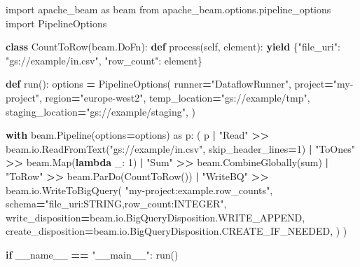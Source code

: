 \documentclass[
  11pt,
  british,
  oneside]{book}
\newenvironment{Shaded}{\begin{snugshade}}{\end{snugshade}}
\newcommand{\BuiltInTok}[1]{#1}
\newcommand{\ControlFlowTok}[1]{\textcolor[rgb]{0.13,0.29,0.53}{\textbf{#1}}}
\newcommand{\DecValTok}[1]{\textcolor[rgb]{0.00,0.00,0.81}{#1}}
\newcommand{\ImportTok}[1]{#1}
\newcommand{\KeywordTok}[1]{\textcolor[rgb]{0.13,0.29,0.53}{\textbf{#1}}}
\newcommand{\NormalTok}[1]{#1}
\newcommand{\OperatorTok}[1]{\textcolor[rgb]{0.81,0.36,0.00}{\textbf{#1}}}
\newcommand{\StringTok}[1]{\textcolor[rgb]{0.31,0.60,0.02}{#1}}
\newcommand{\VariableTok}[1]{\textcolor[rgb]{0.00,0.00,0.00}{#1}}
\begin{document}
\begin{Shaded}
\begin{Highlighting}[]
\ImportTok{import}\NormalTok{ apache\_beam }\ImportTok{as}\NormalTok{ beam}
\ImportTok{from}\NormalTok{ apache\_beam.options.pipeline\_options }\ImportTok{import}\NormalTok{ PipelineOptions}

\KeywordTok{class}\NormalTok{ CountToRow(beam.DoFn):}
    \KeywordTok{def}\NormalTok{ process(}\VariableTok{self}\NormalTok{, element):}
        \ControlFlowTok{yield}\NormalTok{ \{}\StringTok{"file\_uri"}\NormalTok{: }\StringTok{"gs://example/in.csv"}\NormalTok{, }\StringTok{"row\_count"}\NormalTok{: element\}}

\KeywordTok{def}\NormalTok{ run():}
\NormalTok{    options }\OperatorTok{=}\NormalTok{ PipelineOptions(}
\NormalTok{        runner}\OperatorTok{=}\StringTok{"DataflowRunner"}\NormalTok{,}
\NormalTok{        project}\OperatorTok{=}\StringTok{"my{-}project"}\NormalTok{,}
\NormalTok{        region}\OperatorTok{=}\StringTok{"europe{-}west2"}\NormalTok{,}
\NormalTok{        temp\_location}\OperatorTok{=}\StringTok{"gs://example/tmp"}\NormalTok{,}
\NormalTok{        staging\_location}\OperatorTok{=}\StringTok{"gs://example/staging"}\NormalTok{,}
\NormalTok{    )}

    \ControlFlowTok{with}\NormalTok{ beam.Pipeline(options}\OperatorTok{=}\NormalTok{options) }\ImportTok{as}\NormalTok{ p:}
\NormalTok{        (}
\NormalTok{            p}
            \OperatorTok{|} \StringTok{"Read"}      \OperatorTok{\textgreater{}\textgreater{}}\NormalTok{ beam.io.ReadFromText(}\StringTok{"gs://example/in.csv"}\NormalTok{, skip\_header\_lines}\OperatorTok{=}\DecValTok{1}\NormalTok{)}
            \OperatorTok{|} \StringTok{"ToOnes"}    \OperatorTok{\textgreater{}\textgreater{}}\NormalTok{ beam.Map(}\KeywordTok{lambda}\NormalTok{ \_: }\DecValTok{1}\NormalTok{)}
            \OperatorTok{|} \StringTok{"Sum"}       \OperatorTok{\textgreater{}\textgreater{}}\NormalTok{ beam.CombineGlobally(}\BuiltInTok{sum}\NormalTok{)}
            \OperatorTok{|} \StringTok{"ToRow"}     \OperatorTok{\textgreater{}\textgreater{}}\NormalTok{ beam.ParDo(CountToRow())}
            \OperatorTok{|} \StringTok{"WriteBQ"}   \OperatorTok{\textgreater{}\textgreater{}}\NormalTok{ beam.io.WriteToBigQuery(}
                \StringTok{"my{-}project:example.row\_counts"}\NormalTok{,}
\NormalTok{                schema}\OperatorTok{=}\StringTok{"file\_uri:STRING,row\_count:INTEGER"}\NormalTok{,}
\NormalTok{                write\_disposition}\OperatorTok{=}\NormalTok{beam.io.BigQueryDisposition.WRITE\_APPEND,}
\NormalTok{                create\_disposition}\OperatorTok{=}\NormalTok{beam.io.BigQueryDisposition.CREATE\_IF\_NEEDED,}
\NormalTok{            )}
\NormalTok{        )}

\ControlFlowTok{if} \VariableTok{\_\_name\_\_} \OperatorTok{==} \StringTok{"\_\_main\_\_"}\NormalTok{:}
\NormalTok{    run()}
\end{Highlighting}
\end{Shaded}
\end{document}
